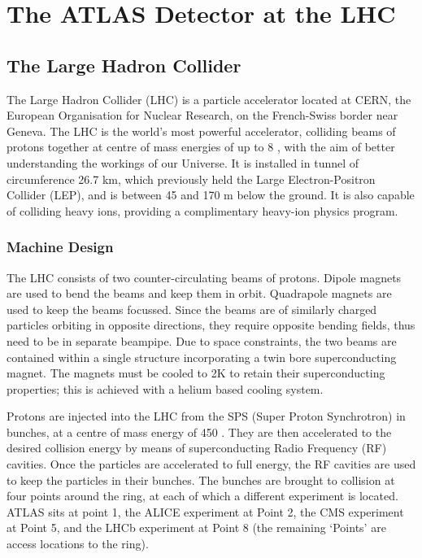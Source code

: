 \graphicspath{{Chapters/Detector/Figures/}}
\chapter{The ATLAS Detector at the LHC}
\label{chap:Detector}

\section{The Large Hadron Collider}

The Large Hadron Collider (LHC) is a particle accelerator located at CERN, the
European Organisation for Nuclear Research, on the French-Swiss border near
Geneva. The LHC is the world's most powerful accelerator, colliding beams of
protons together at centre of mass energies of up to 8 \TeV, with the aim of
better understanding the workings of our Universe. It is installed in
tunnel of circumference 26.7 km, which previously held the Large
Electron-Positron Collider (LEP), and is between 45 and 170 m below the ground.
It is also capable of colliding heavy ions, providing a complimentary heavy-ion
physics program.

\subsection{Machine Design}

The LHC consists of two counter-circulating beams of protons. Dipole magnets are
used to bend the beams and keep them in orbit. Quadrapole magnets are used to
keep the beams focussed. Since the beams are of similarly charged particles
orbiting in opposite directions, they require opposite bending fields, thus need
to be in separate beampipe. Due to space constraints, the two beams are
contained within a single structure incorporating a twin bore superconducting
magnet. The magnets must be cooled to 2K to retain their superconducting
properties; this is achieved with a helium based cooling system. 

Protons are injected into the LHC from the SPS (Super Proton Synchrotron) in
bunches, at a centre of mass energy of 450 \GeV. They are then accelerated to the desired
collision energy by means of superconducting Radio Frequency (RF) cavities. Once the
particles are accelerated to full energy, the RF cavities are used to keep the
particles in their bunches. The bunches are brought to collision at four points
around the ring, at each of which a different experiment is located. ATLAS sits at
point 1, the ALICE experiment at Point 2, the CMS experiment at Point 5, and the
LHCb experiment at Point 8 (the remaining `Points' are access locations to the
ring).

